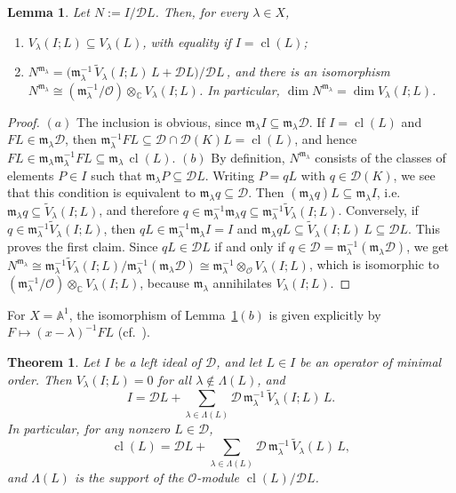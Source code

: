 \documentclass[11pt,reqno]{amsart}
\theoremstyle{plain}
\newtheorem{theorem}{Theorem}[section]
\newtheorem{lemma}{Lemma}[section]
\theoremstyle{definition}
\theoremstyle{remark}
\numberwithin{equation}{section}
\newcommand{\cD}{\mathcal{D}}
\newcommand{\cO}{\mathcal{O}}
\newcommand{\C}{\mathbb{C}}
\newcommand{\A}{\mathbb{A}}
\newcommand{\ml}{\mathfrak{m}_\lambda}
\DeclareMathOperator{\cl}{cl}
\begin{document}
\begin{lemma}
\label{L4.1}
Let $N := I/\cD L$. Then, for every $\lambda \in X$,
\begin{enumerate}
\item[$(a)$] $V_\lambda(I;L) \subseteq V_\lambda(L)$, with equality if $I = \cl(L)$;
\item[$(b)$] $N^{\ml} = \bigl(\ml^{-1}\, \widetilde{V}_\lambda(I;L)\, L + \cD L\bigr)/\cD L\,$,
and there is an isomorphism $N^{\ml} \cong (\ml^{-1}/\cO) \otimes_{\C} V_\lambda(I;L)$. In
particular, $\dim N^{\ml} = \dim V_\lambda(I;L)$.
\end{enumerate}
\end{lemma}

\begin{proof}
$(a)$ The inclusion is obvious, since $\ml I \subseteq \ml \cD$. If $I = \cl(L)$ and
$F L \in \ml \cD$, then $\ml^{-1} F L \subseteq \cD \cap \cD(K) L = \cl(L)$, and hence
$F L \in \ml \ml^{-1} F L \subseteq \ml\, \cl(L)$. $(b)$ By definition, $N^{\ml}$ consists of the
classes of elements $P \in I$ such that $\ml P \subseteq \cD L$. Writing $P = q L$ with
$q \in \cD(K)$, we see that this condition is equivalent to $\ml q \subseteq \cD$. Then
$(\ml q) L \subseteq \ml I$, i.e.\ $\ml q \subseteq \widetilde{V}_\lambda(I;L)$, and therefore
$q \in \ml^{-1} \ml q \subseteq \ml^{-1} \widetilde{V}_\lambda(I;L)$. Conversely, if
$q \in \ml^{-1} \widetilde{V}_\lambda(I;L)$, then $q L \in \ml^{-1} \ml I = I$ and $\ml q L
\subseteq \widetilde{V}_\lambda(I;L)\, L \subseteq \cD L$. This proves the first claim. Since
$q L \in \cD L$ if and only if $q \in \cD = \ml^{-1} (\ml \cD)$, we get
$N^{\ml} \cong \ml^{-1} \widetilde{V}_\lambda(I;L)/\ml^{-1}(\ml \cD) \cong \ml^{-1} \otimes_{\cO}
V_\lambda(I;L)$, which is isomorphic to $(\ml^{-1}/\cO) \otimes_{\C} V_\lambda(I;L)$, because
$\ml$ annihilates $V_\lambda(I;L)$.
\end{proof}

For $X = \A^1$, the isomorphism of Lemma~\ref{L4.1}$(b)$ is given explicitly by $F \mapsto
(x - \lambda)^{-1} F L$ (cf.\ \cite[Theorem 2.5]{Tsai}).

\begin{theorem}
\label{T4.1}
Let $I$ be a left ideal of $\cD$, and let $L \in I$ be an operator of minimal order. Then
$V_\lambda(I;L) = 0$ for all $\lambda \notin \Lambda(L)$, and
\begin{equation}
\label{E42}
  I = \cD L + \sum_{\lambda \in \Lambda(L)} \cD\, \ml^{-1}\, \widetilde{V}_\lambda(I;L)\, L .
\end{equation}
In particular, for any nonzero $L \in \cD$,
\begin{equation}
\label{E43}
  \cl(L) = \cD L + \sum_{\lambda \in \Lambda(L)} \cD\, \ml^{-1}\, \widetilde{V}_\lambda(L)\, L ,
\end{equation}
and $\Lambda(L)$ is the support of the $\cO$-module $\cl(L)/\cD L$.
\end{theorem}
\end{document}

